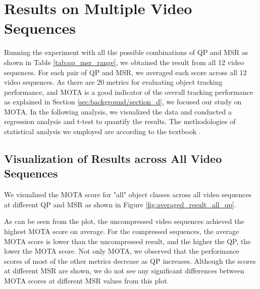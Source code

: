 \section{Results on Multiple Video Sequences}
\label{sec:results/section_a}

Running the experiment with all the possible combinations of QP and MSR as shown in Table \ref{tab:qp_msr_range}, we obtained the result from all 12 video sequences. For each pair of QP and MSR, we averaged each score across all 12 video sequences. As there are 20 metrics for evaluating object tracking performance, and MOTA is a good indicator of the overall tracking performance as explained in Section \ref{sec:background/section_d}, we focused our study on MOTA. In the following analysis, we visualized the data and conducted a regression analysis and t-test to quantify the results. The methodologies of statistical analysis we employed are according to the textbook \cite{kutner_applied_2005}.


\subsection{Visualization of Results across All Video Sequences}
\label{subsec:/results/section_a/visualization}
We visualized the MOTA score for "all" object classes across all video sequences at different QP and MSR as shown in Figure \ref{fig:averaged_result_all_qp}.

As can be seen from the plot, the uncompressed video sequences achieved the highest MOTA score on average. For the compressed sequences, the average MOTA score is lower than the uncompressed result, and the higher the QP, the lower the MOTA score. Not only MOTA, we observed that the performance scores of most of the other metrics decrease as QP increases. Although the scores at different MSR are shown, we do not see any significant differences between MOTA scores at different MSR values from this plot.


